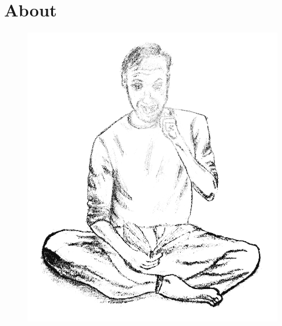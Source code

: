 \chapter{About}\label{ch:about}


\begin{figure}[h]
    \begin{center}
        {\includegraphics[width=0.3\paperwidth]{images/testpic}}
    \end{center}\label{img:about}
\end{figure}


